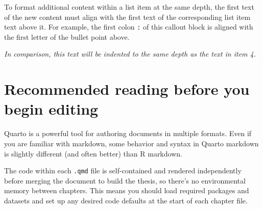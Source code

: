 \documentclass[
  11pt,
  letterpaper,
  twoside]{report}
\begin{document}
\begin{enumerate}
\begin{itemize}
    \begin{tcolorbox}[enhanced jigsaw, coltitle=black, leftrule=.75mm, rightrule=.15mm, breakable, titlerule=0mm, bottomrule=.15mm, left=2mm, colbacktitle=quarto-callout-note-color!10!white, arc=.35mm, toprule=.15mm, title=\textcolor{quarto-callout-note-color}{\faInfo}\hspace{0.5em}{Note}, toptitle=1mm, colback=white, bottomtitle=1mm, opacitybacktitle=0.6, opacityback=0, colframe=quarto-callout-note-color-frame]

    To format additional content within a list item at the same depth,
    the first text of the new content must align with the first text of
    the corresponding list item text above it. For example, the first
    colon \texttt{:} of this callout block is aligned with the first
    letter of the bullet point above.

    \end{tcolorbox}
  \end{itemize}

  \emph{In comparison, this text will be indented to the same depth as
  the text in item 4.}
\end{enumerate}

\section{Recommended reading before you begin
editing}\label{recommended-reading-before-you-begin-editing}

Quarto is a powerful tool for authoring documents in multiple formats.
Even if you are familiar with markdown, some behavior and syntax in
Quarto markdown is slightly different (and often better) than R
markdown.

\begin{tcolorbox}[enhanced jigsaw, coltitle=black, leftrule=.75mm, rightrule=.15mm, breakable, titlerule=0mm, bottomrule=.15mm, left=2mm, colbacktitle=quarto-callout-caution-color!10!white, arc=.35mm, toprule=.15mm, title=\textcolor{quarto-callout-caution-color}{\faFire}\hspace{0.5em}{Caution}, toptitle=1mm, colback=white, bottomtitle=1mm, opacitybacktitle=0.6, opacityback=0, colframe=quarto-callout-caution-color-frame]

The code within each \texttt{.qmd} file is self-contained and rendered
independently before merging the document to build the thesis, so
there's no environmental memory between chapters. This means you should
load required packages and datasets and set up any desired code defaults
at the start of each chapter file.

\end{tcolorbox}
\end{document}

